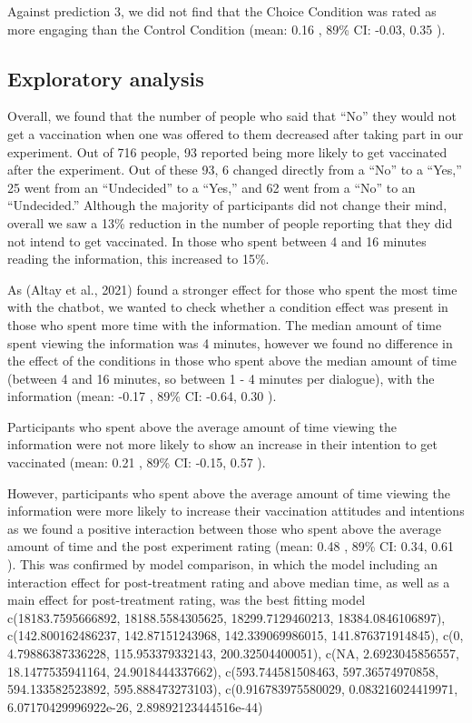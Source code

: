 \documentclass[english,,jou,floatsintext]{apa6}
\begin{document}
Against prediction 3, we did not find that the Choice Condition was rated as more engaging than the Control Condition (mean: 0.16 , 89\% CI: -0.03, 0.35 ).

\hypertarget{exploratory-analysis}{%
\subsection{Exploratory analysis}\label{exploratory-analysis}}

Overall, we found that the number of people who said that \enquote{No} they would not get a vaccination when one was offered to them decreased after taking part in our experiment. Out of 716 people, 93 reported being more likely to get vaccinated after the experiment. Out of these 93, 6 changed directly from a \enquote{No} to a \enquote{Yes,} 25 went from an \enquote{Undecided} to a \enquote{Yes,} and 62 went from a \enquote{No} to an \enquote{Undecided.} Although the majority of participants did not change their mind, overall we saw a 13\% reduction in the number of people reporting that they did not intend to get vaccinated. In those who spent between 4 and 16 minutes reading the information, this increased to 15\%.

As (Altay et al., 2021) found a stronger effect for those who spent the most time with the chatbot, we wanted to check whether a condition effect was present in those who spent more time with the information. The median amount of time spent viewing the information was 4 minutes, however we found no difference in the effect of the conditions in those who spent above the median amount of time (between 4 and 16 minutes, so between 1 - 4 minutes per dialogue), with the information (mean: -0.17 , 89\% CI: -0.64, 0.30 ).

Participants who spent above the average amount of time viewing the information were not more likely to show an increase in their intention to get vaccinated (mean: 0.21 , 89\% CI: -0.15, 0.57 ).

However, participants who spent above the average amount of time viewing the information were more likely to increase their vaccination attitudes and intentions as we found a positive interaction between those who spent above the average amount of time and the post experiment rating (mean: 0.48 , 89\% CI: 0.34, 0.61 ). This was confirmed by model comparison, in which the model including an interaction effect for post-treatment rating and above median time, as well as a main effect for post-treatment rating, was the best fitting model c(18183.7595666892, 18188.5584305625, 18299.7129460213, 18384.0846106897), c(142.800162486237, 142.87151243968, 142.339069986015, 141.876371914845), c(0, 4.79886387336228, 115.953379332143, 200.32504400051), c(NA, 2.6923045856557, 18.1477535941164, 24.9018444337662), c(593.744581508463, 597.36574970858, 594.133582523892, 595.888473273103), c(0.916783975580029, 0.083216024419971, 6.07170429996922e-26, 2.89892123444516e-44)
\end{document}
